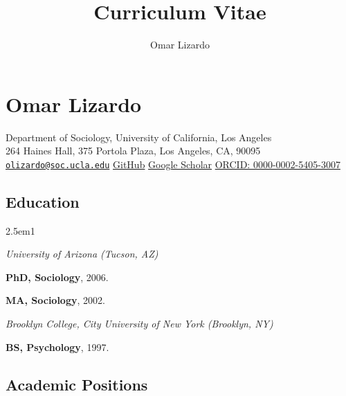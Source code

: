 \documentclass[
]{article}
\title{Curriculum Vitae}
\subtitle{Omar Lizardo}
\author{}
\date{}
\newenvironment{cventry}{\begin{hangparas}{2.5em}{1}}{\end{hangparas}}
\begin{document}
\maketitle


\section{Omar Lizardo}\label{omar-lizardo}

Department of Sociology, University of California, Los Angeles\\
264 Haines Hall, 375 Portola Plaza, Los Angeles, CA, 90095\\
\href{mailto:olizardo@soc.ucla.edu}{\nolinkurl{olizardo@soc.ucla.edu}}
\textbar{} \textbar{} \href{https://github.com/olizardo}{GitHub}
\textbar{}
\href{https://scholar.google.com/citations?user=Lt5nMNkAAAAJ}{Google
Scholar} \textbar{} \href{https://orcid.org/0000-0002-5405-3007}{ORCID:
0000-0002-5405-3007}

\subsection{Education}\label{education}

\begin{cventry}

\emph{University of Arizona (Tucson, AZ)}

\textbf{PhD, Sociology}, 2006.

\textbf{MA, Sociology}, 2002.

\emph{Brooklyn College, City University of New York (Brooklyn, NY)}

\textbf{BS, Psychology}, 1997.

\end{cventry}

\subsection{Academic Positions}\label{academic-positions}
\end{document}
